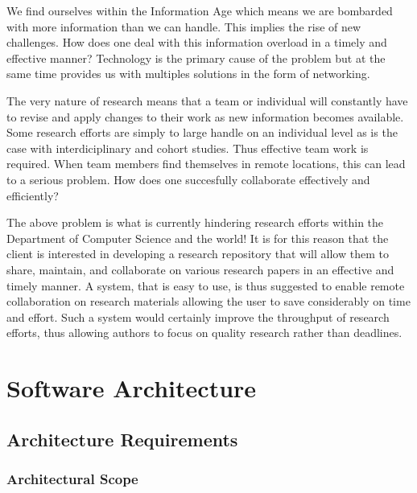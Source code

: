 \documentclass[a4paper,12pt]{article}
\begin{document}
We find ourselves within the Information Age which means we are bombarded with more information than we can handle. This implies the rise of new challenges. How does one deal with this information overload in a timely and effective manner? Technology is the primary cause of the problem but at the same time provides us with multiples solutions in the form of networking. 

The very nature of research means that a team or individual will constantly have to revise and apply changes to their work as new information becomes available. Some research efforts are simply to large handle on an individual level as is the case with interdiciplinary and cohort studies. Thus effective team work is required. When team members find themselves in remote locations, this can lead to a serious problem. How does one succesfully collaborate effectively and efficiently?

The above problem is what is currently hindering research efforts within the Department of Computer Science and the world! It is for this reason that the client is interested in developing a research repository that will allow them to share, maintain, and collaborate on various research papers in an effective and timely manner. A system, that is easy to use, is thus suggested to enable remote collaboration on research materials allowing the user to save considerably on time and effort. Such a system would certainly improve the throughput of research efforts, thus allowing authors to focus on quality research rather than deadlines.  

\newpage
\section{Software Architecture}
\subsection{Architecture Requirements}
\subsubsection{Architectural Scope}
\end{document}
